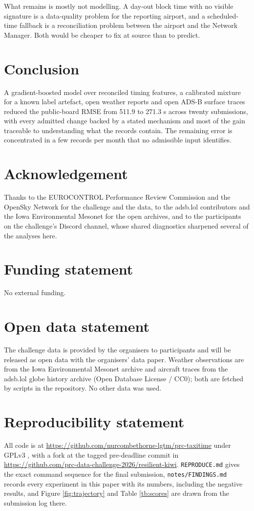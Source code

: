 \documentclass[
  manuscript=article,
  layout=preprint,
  year=2027,
  volume=x,
]{extra/joas}
\begin{document}
What remains is mostly not modelling. A day-out block time with no visible signature is a data-quality problem for the reporting airport, and a scheduled-time fallback is a reconciliation problem between the airport and the Network Manager. Both would be cheaper to fix at source than to predict.

\section{Conclusion}

A gradient-boosted model over reconciled timing features, a calibrated mixture for a known label artefact, open weather reports and open ADS-B surface traces reduced the public-board RMSE from 511.9 to 271.3 s across twenty submissions, with every admitted change backed by a stated mechanism and most of the gain traceable to understanding what the records contain. The remaining error is concentrated in a few records per month that no admissible input identifies.

\section*{Acknowledgement}
Thanks to the EUROCONTROL Performance Review Commission and the OpenSky Network for the challenge and the data, to the adsb.lol contributors and the Iowa Environmental Mesonet for the open archives, and to the participants on the challenge's Discord channel, whose shared diagnostics sharpened several of the analyses here.

\section*{Funding statement}
No external funding.

\section*{Open data statement}
The challenge data is provided by the organisers to participants and will be released as open data with the organisers' data paper. Weather observations are from the Iowa Environmental Mesonet archive \cite{iem2026} and aircraft traces from the adsb.lol globe history archive \cite{adsblol2026} (Open Database License / CC0); both are fetched by scripts in the repository. No other data was used.

\section*{Reproducibility statement}
All code is at \url{https://github.com/nurcombethorne-lgtm/prc-taxitime} under GPLv3 \cite{resilientkiwi2026}, with a fork at the tagged pre-deadline commit in \url{https://github.com/prc-data-challenge-2026/resilient-kiwi}. \texttt{REPRODUCE.md} gives the exact command sequence for the final submission, \texttt{notes/FINDINGS.md} records every experiment in this paper with its numbers, including the negative results, and Figure \ref{fig:trajectory} and Table \ref{tb:scores} are drawn from the submission log there.

\printbibliography
\end{document}

